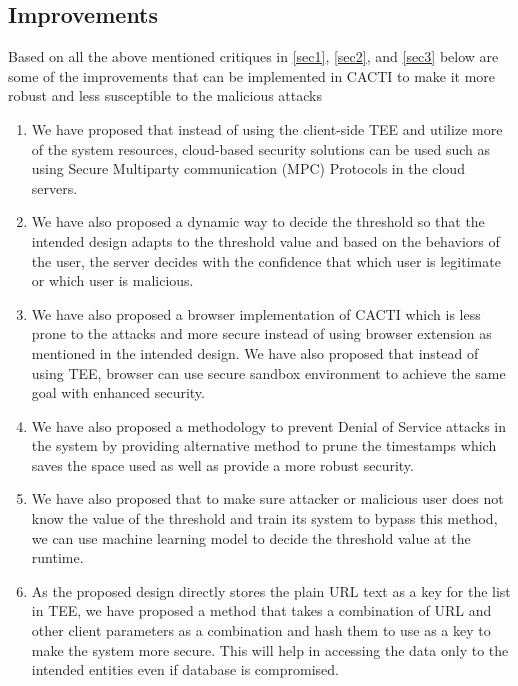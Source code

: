 \documentclass[runningheads,10pt]{llncs}
\begin{document}
	\subsection{Improvements}

	Based on all the above mentioned critiques in \ref{sec1}, \ref{sec2}, and \ref{sec3} below are some of the improvements that can be implemented in CACTI \cite{ourpaper} to make it more robust and less susceptible to the malicious attacks

	\begin{enumerate}
		\item We have proposed that instead of using the client-side TEE and utilize more of the system resources, cloud-based security solutions can be used such as using Secure Multiparty communication (MPC) Protocols in the cloud servers.

		\item We have also proposed a dynamic way to decide the threshold so that the intended design adapts to the threshold value and based on the behaviors of the user, the server decides with the confidence that which user is legitimate or which user is malicious.

		\item We have also proposed a browser implementation of CACTI \cite{ourpaper} which is less prone to the attacks and more secure instead of using browser extension as mentioned in the intended design. We have also proposed that instead of using TEE, browser can use secure sandbox environment to achieve the same goal with enhanced security.

		\item We have also proposed a methodology to prevent Denial of Service attacks in the system by providing alternative method to prune the timestamps which saves the space used as well as provide a more robust security.

		\item We have also proposed that to make sure attacker or malicious user does not know the value of the threshold and train its system to bypass this method, we can use machine learning model to decide the threshold value at the runtime.

		\item As the proposed design directly stores the plain URL text as a key for the list in TEE, we have proposed a method that takes a combination of URL and other client parameters as a combination and hash them to use as a key to make the system more secure. This will help in accessing the data only to the intended entities even if database is compromised.


\end{enumerate}
\end{document}
